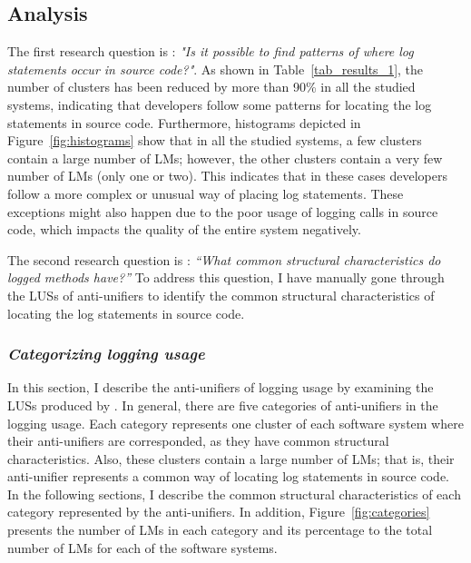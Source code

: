\subsection{Analysis}  \label{analysis}
The first research question is : \emph{"Is it possible to find patterns of where log statements occur in source code?"}. As shown in Table~\ref{tab_results_1}, the number of clusters has been reduced by more than 90\% in all the studied systems, indicating that developers follow some patterns for locating the log statements in source code. Furthermore, histograms depicted in Figure~\ref{fig:histograms} show that in all the studied systems, a few clusters contain a large number of LMs; however, the other clusters contain a very few number of LMs (only one or two). This indicates that in these cases developers follow a more complex or unusual way of placing log statements. These exceptions might also happen due to the poor usage of logging calls in source code, which impacts the quality of the entire system negatively.

The second research question is : \emph{``What common structural characteristics do logged methods have?''}
To address this question, I have manually gone through the LUSs of anti-unifiers to identify the common structural characteristics of locating the log statements in source code.


\subsubsection{\emph{Categorizing logging usage}} \label{categories}
In this section, I describe the anti-unifiers of logging usage by examining the LUSs produced by . In general, there are five categories of anti-unifiers in the logging usage. Each category represents one cluster of each software system where their anti-unifiers are corresponded, as they have common structural characteristics. Also, these clusters contain a large number of LMs; that is, their anti-unifier represents a common way of locating log statements in source code. In the following sections, I describe the common structural characteristics of each category represented by the anti-unifiers. In addition, Figure~\ref{fig:categories} presents the number of LMs in each category and its percentage to the total number of LMs for each of the software systems.

